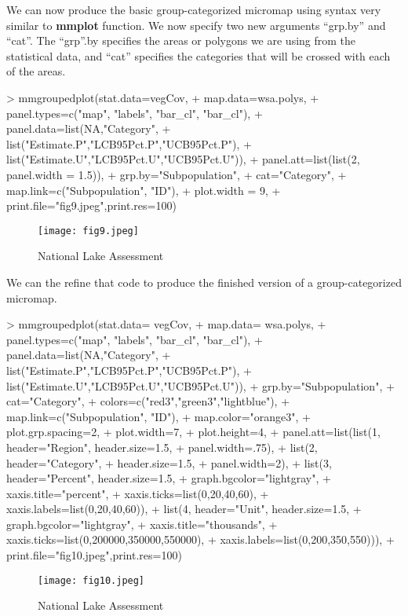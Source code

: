 \documentclass{article}
\begin{document}
We can now produce the basic group-categorized micromap using syntax very similar to \textbf{mmplot} function.  We now specify two new arguments ``grp.by'' and ``cat''.  The ``grp''.by specifies the areas or polygons we are using from the statistical data, and ``cat'' specifies the categories that will be crossed with each of the areas.
\begin{Schunk}
\begin{Sinput}
> mmgroupedplot(stat.data=vegCov,
+               map.data=wsa.polys,
+               panel.types=c("map", "labels", "bar_cl", "bar_cl"),
+               panel.data=list(NA,"Category",
+                               list("Estimate.P","LCB95Pct.P","UCB95Pct.P"),
+                               list("Estimate.U","LCB95Pct.U","UCB95Pct.U")),
+               panel.att=list(list(2, panel.width = 1.5)),
+               grp.by="Subpopulation",
+               cat="Category",
+               map.link=c("Subpopulation", "ID"),
+               plot.width = 9,
+               print.file="fig9.jpeg",print.res=100)
\end{Sinput}
\end{Schunk}
\begin{figure}[!tbp] 
\begin{center} 
\texttt{[image: fig9.jpeg]}
  \caption{National Lake Assessment}
  \label{fig9} 
\end{center} 
\end{figure}
We can the refine that code to produce the finished version of a group-categorized micromap.
\begin{Schunk}
\begin{Sinput}
> mmgroupedplot(stat.data= vegCov,
+ map.data= wsa.polys,
+ panel.types=c("map", "labels", "bar_cl", "bar_cl"),
+ panel.data=list(NA,"Category",
+ list("Estimate.P","LCB95Pct.P","UCB95Pct.P"),
+ list("Estimate.U","LCB95Pct.U","UCB95Pct.U")),
+ grp.by="Subpopulation",
+ cat="Category",
+ colors=c("red3","green3","lightblue"),
+ map.link=c("Subpopulation", "ID"),
+ map.color="orange3",
+ plot.grp.spacing=2,
+ plot.width=7,
+ plot.height=4,
+ panel.att=list(list(1, header="Region", header.size=1.5,
+ panel.width=.75),
+ list(2, header="Category",
+ header.size=1.5,
+ panel.width=2),
+ list(3, header="Percent", header.size=1.5,
+ graph.bgcolor="lightgray",
+ xaxis.title="percent",
+ xaxis.ticks=list(0,20,40,60),
+ xaxis.labels=list(0,20,40,60)),
+ list(4, header="Unit", header.size=1.5,
+ graph.bgcolor="lightgray",
+ xaxis.title="thousands",
+ xaxis.ticks=list(0,200000,350000,550000),
+ xaxis.labels=list(0,200,350,550))),
+ print.file="fig10.jpeg",print.res=100)
\end{Sinput}
\end{Schunk}
\begin{figure}[!tbp] 
\begin{center} 
\texttt{[image: fig10.jpeg]}
  \caption{National Lake Assessment}
  \label{fig10} 
\end{center} 
\end{figure}
\end{document}
